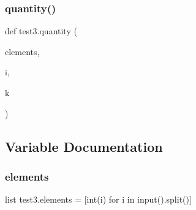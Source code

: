 \mbox{\label{namespacetest3_a06ddebe2e58ee64b079084adb59637f1}} 
\subsubsection{\texorpdfstring{quantity()}{quantity()}}
{\footnotesize\ttfamily def test3.\+quantity (\begin{DoxyParamCaption}\item[{}]{elements,  }\item[{}]{i,  }\item[{}]{k }\end{DoxyParamCaption})}



\subsection{Variable Documentation}
\mbox{\label{namespacetest3_a0b4b1cdfeb38dc608859e69d05afefb1}} 
\subsubsection{\texorpdfstring{elements}{elements}}
{\footnotesize\ttfamily list test3.\+elements = \mbox{[}int(i) for i in input().split()\mbox{]}}

